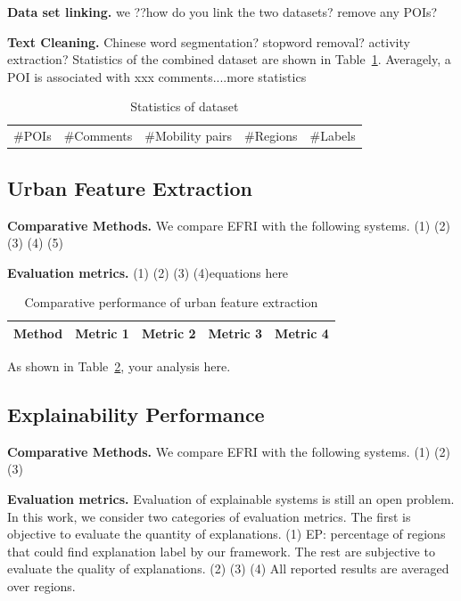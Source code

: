 \documentclass[runningheads]{llncs}
\begin{document}
\textbf{Data set linking.} we ??how do you link the two datasets?
remove any POIs?


\textbf{Text Cleaning.} Chinese word segmentation? stopword removal?
activity extraction?
Statistics of the combined dataset are shown in Table~\ref{tab:dataset}.
Averagely, a POI is associated with xxx comments....more statistics

\begin{table}[h]
\caption{Statistics of dataset}\label{tab:dataset}
\begin{tabular}{|c|c|c|c|c|}
\hline
\#POIs & \#Comments & \#Mobility pairs & \#Regions & \#Labels \\
\end{tabular}
\end{table}

\subsection{Urban Feature Extraction}

\textbf{Comparative Methods.} We compare EFRI with the following systems. (1) (2) (3) (4) (5)

\textbf{Evaluation metrics.} (1) (2) (3) (4)equations here

\begin{table}[h]
\caption{Comparative performance of urban feature extraction}\label{tab:extraction}
\begin{tabular}{|c|c|c|c|c|}
\hline
Method & Metric 1 & Metric 2 & Metric 3 & Metric 4\\\hline
\end{tabular}
\end{table}

As shown in Table~\ref{tab:extraction}, your analysis here.

\subsection{Explainability Performance}

\textbf{Comparative Methods.} We compare EFRI with the following systems. (1) (2) (3) 

\textbf{Evaluation metrics.} Evaluation of explainable systems is still an open problem. In this work, we consider two categories of evaluation metrics. The first is objective to evaluate the quantity of explanations. (1) EP: percentage of regions that could find explanation label by our framework. The rest are subjective to evaluate the quality of explanations.  (2) (3) (4) All reported results are averaged over regions.
\end{document}
